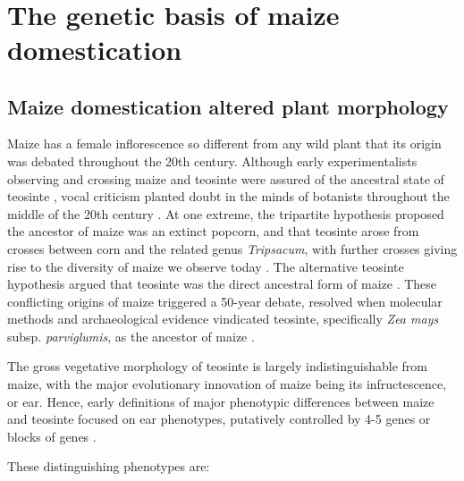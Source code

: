 \documentclass[a4paper]{article}
\begin{document}
﻿\section*{The genetic basis of maize domestication}

\subsection*{Maize domestication altered plant morphology}

﻿Maize has a female inflorescence so different from any wild plant that its origin was debated throughout the 20th century.
Although early experimentalists observing and crossing maize and teosinte were assured of the ancestral state of teosinte \citep{harshberger1896, collins1920, weatherwax1924}, %
﻿vocal criticism planted doubt in the minds of botanists throughout the middle of the 20th century \citep{mangelsdorf1939, mangelsdorf1974}.
﻿At one extreme, the tripartite hypothesis proposed the ancestor of maize was an extinct popcorn, and that teosinte arose from crosses between corn and the related genus \textit{Tripsacum}, with further crosses giving rise to the diversity of maize we observe today \citep{mangelsdorf1939}.
﻿The alternative teosinte hypothesis argued that teosinte was the direct ancestral form of maize \citep{beadle1939}.
﻿These conflicting origins of maize triggered a 50-year debate, resolved when molecular methods and archaeological evidence vindicated teosinte, specifically \textit{Zea mays} subsp. \textit{parviglumis}, as the ancestor of maize \citep{matsuoka2002, piperno2009, bennetzen2001}.

﻿The gross vegetative morphology of teosinte is largely indistinguishable from maize, with the major evolutionary innovation of maize being its infructescence, or ear.
Hence, early definitions of major phenotypic differences between maize and teosinte focused on ear phenotypes, putatively controlled by 4-5 genes or blocks of genes \citep{beadle1939, mangelsdorf1939}.

\noindent These distinguishing phenotypes are:
\end{document}
